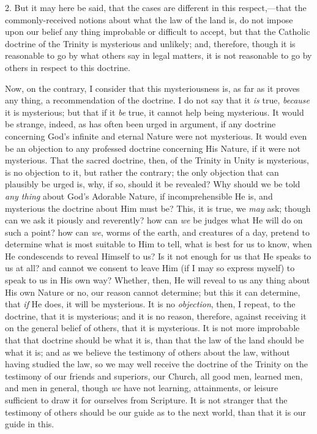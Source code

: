 2. But it may here be said, that the cases are different in this
respect,—that the commonly-received notions about what the law of
the land is, do not impose upon our belief any thing improbable or
difficult to accept, but that the Catholic doctrine of the Trinity is
mysterious and unlikely; and, therefore, though it is reasonable to go
by what others say in legal matters, it is not reasonable to go by
others in respect to this doctrine.

Now, on the contrary, I consider that this mysteriousness is, as
far as it proves any thing, a recommendation of the doctrine. I do not
say that it \emph{is} true, \emph{because} it is mysterious; but that
if it \emph{be} true, it cannot help being mysterious. It would be
strange, indeed, as has often been urged in argument, if any doctrine
concerning God's infinite and eternal Nature were not mysterious. It
would even be an objection to any professed doctrine concerning His
Nature, if it were not mysterious. That the sacred doctrine, then, of
the Trinity in Unity is mysterious, is no objection to it, but rather
the contrary; the only objection that can plausibly be urged is, why,
if so, should it be revealed? Why should we be told \emph{any thing}
about God's Adorable Nature, if incomprehensible He is, and mysterious
the doctrine about Him must be? This, it is true, we \emph{may} ask;
though can we ask it piously and reverently? how can \emph{we} be
judges what He will do on such a point? how can \emph{we}, worms of
the earth, and creatures of a day, pretend to determine what is most
suitable to Him to tell, what is best for us to know, when He
condescends to reveal Himself to us? Is it not enough for us that He
speaks to us at all? and cannot we consent to leave Him (if I may so
express myself) to speak to us in His own way? Whether, then, He will
reveal to us any thing about His own Nature or no, our reason cannot
determine; but this it can determine, that \emph{if} He does, it will
be mysterious. It is no \emph{objection}, then, I repeat, to the
doctrine, that it is mysterious; and it is no reason, therefore,
against receiving it on the general belief of others, that it is
mysterious. It is not more improbable that that doctrine should be
what it is, than that the law of the land should be what it is; and as
we believe the testimony of others about the law, without having
studied the law, so we may well receive the doctrine of the Trinity on
the testimony of our friends and superiors, our Church, all good men,
learned men, and men in general, though \emph{we} have not learning,
attainments, or leisure sufficient to draw it for ourselves from
Scripture. It is not stranger that the testimony of others should be
our guide as to the next world, than that it is our guide in this.

